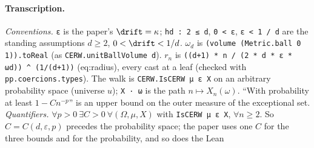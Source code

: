 \paragraph{Transcription.}
\emph{Conventions.} \verb!ε! is the paper's $\drift=\kappa$; \verb!hd : 2 ≤ d!, \verb!0 < ε!, \verb!ε < 1 / d! are the standing assumptions $d\ge2$, $0<\drift<1/d$. $\omega_d$ is \verb!(volume (Metric.ball 0 1)).toReal! (as \verb!CERW.unitBallVolume d!). $r_n$ is \verb!((d+1) * n / (2 * d * ε * ωd)) ^ (1/(d+1))! (eq:radius), every cast at a leaf (checked with \verb!pp.coercions.types!). The walk is \verb!CERW.IsCERW μ ε X! on an arbitrary probability space (universe $u$); \verb!X · ω! is the path $n\mapsto X_n(\omega)$. ``With probability at least $1-Cn^{-p}$'' is an upper bound on the outer measure of the exceptional set. \emph{Quantifiers.} $\forall p>0\ \exists C>0\ \forall(\Omega,\mu,X)$ with \verb!IsCERW μ ε X!, $\forall n\ge2$. So $C=C(d,\varepsilon,p)$ precedes the probability space; the paper uses one $C$ for the three bounds and for the probability, and so does the Lean
